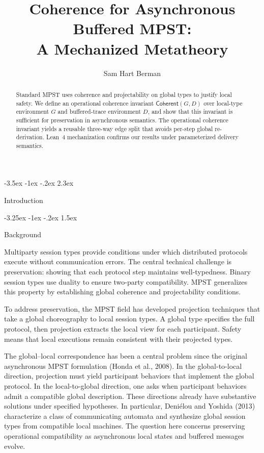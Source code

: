 \documentclass[a4paper,10pt,twocolumn,english]{article}
\title{Coherence for Asynchronous Buffered MPST:\\A Mechanized Metatheory}
\author{Sam Hart Berman}
\date{\empty}
\makeatletter
\renewcommand{\section}{\@startsection{section}{1}{\z@}%
  {-3.5ex \@plus -1ex \@minus -.2ex}%
  {2.3ex}%
  {\raggedright\normalfont\large\bfseries}}
\renewcommand{\subsection}{\@startsection{subsection}{2}{\z@}%
  {-3.25ex \@plus -1ex \@minus -.2ex}%
  {1.5ex}%
  {\raggedright\normalfont\normalsize\bfseries}}
\numberwithin{equation}{section}
\theoremstyle{paperdef}
\theoremstyle{paperplain}
\theoremstyle{paperdef}
\theoremstyle{paperremark}
\newcommand{\Coherent}{\ensuremath{\mathsf{Coherent}}}
\makeatother
\begin{document}
\maketitle

\begin{abstract}
	Standard MPST uses coherence and projectability on global types to justify local safety. We define
	an operational coherence invariant $\Coherent(G,D)$ over local-type environment $G$ and buffered-trace
	environment $D$, and show that this invariant is sufficient for preservation in asynchronous semantics. The
	operational coherence invariant yields a reusable three-way edge split that avoids per-step global
	re-derivation. Lean~4 mechanization confirms our results under parameterized delivery semantics.
\end{abstract}

\section{Introduction}
\label{sec:introduction}

\subsection{Background}

Multiparty session types provide conditions under which distributed protocols execute without communication errors.
The central technical challenge is preservation: showing that each protocol step maintains
well-typedness. Binary session types use duality to ensure two-party compatibility. MPST generalizes
this property by establishing global coherence and projectability conditions.

To address preservation, the MPST field has developed projection techniques that take a global
choreography to local session types. A global type specifies the full protocol, then projection
extracts the local view for each participant. Safety means that local executions remain consistent
with their projected types.

The global--local correspondence has been a central problem since the original asynchronous
MPST formulation (Honda et al., 2008). In the global-to-local direction, projection must yield
participant behaviors that implement the global protocol. In the local-to-global direction,
one asks when participant behaviors admit a compatible global description. These directions
already have substantive solutions under specified hypotheses. In particular, Deni\'{e}lou and
Yoshida (2013) characterize a class of communicating automata and synthesize global session types
from compatible local machines. The question here concerns preserving operational compatibility
as asynchronous local states and buffered messages evolve.
\end{document}
